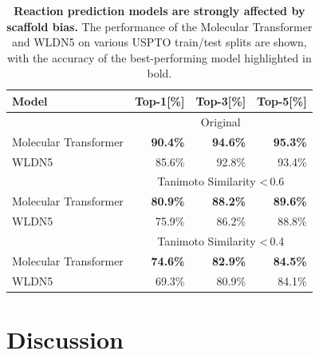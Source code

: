 \begin{table}[!h]
    \centering
    \caption{ \textbf{Reaction prediction models are strongly affected by scaffold bias.} The performance of the Molecular Transformer and WLDN5 on various USPTO train/test splits are shown, with the accuracy of the best-performing model highlighted in bold.}
    \centering
    \label{table:tanimoto}
    \begin{tabular*}{0.8\textwidth}{l@{\extracolsep{\fill}}rrr}
    \toprule
        \textbf{Model} & \textbf{Top-1[\%]} & \textbf{Top-3[\%]} & \textbf{Top-5[\%]}\\ 
        \midrule 
    & \multicolumn{3}{c}{Original} \\
    \midrule
    Molecular Transformer & \textbf{90.4\%} & \textbf{94.6\%} & \textbf{95.3\%}  \\
    WLDN5 & 85.6\% & 92.8\% & 93.4\%  \\
    \midrule 
    & \multicolumn{3}{c}{Tanimoto Similarity \textless\,0.6} \\
    \midrule
    Molecular Transformer & \textbf{80.9\%} & \textbf{88.2\%} & \textbf{89.6\%}  \\
    WLDN5 & 75.9\% & 86.2\% & 88.8\%  \\
    \midrule
    & \multicolumn{3}{c}{Tanimoto Similarity \textless\,0.4}\\
    \midrule
    Molecular Transformer & \textbf{74.6\%} & \textbf{82.9\%} & \textbf{84.5\%} \\
    WLDN5 & 69.3\% & 80.9\% & 84.1\% \\
    \bottomrule
    \end{tabular*}
\end{table}

\section{Discussion}



